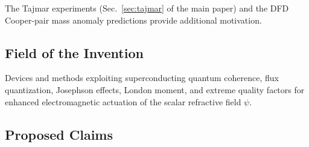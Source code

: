 \documentclass[12pt,letterpaper]{article}
\begin{document}
The Tajmar experiments (Sec.~\ref{sec:tajmar} of the main paper) and
the DFD Cooper-pair mass anomaly predictions provide additional
motivation.

\subsection{Field of the Invention}

Devices and methods exploiting superconducting quantum coherence,
flux quantization, Josephson effects, London moment, and extreme
quality factors for enhanced electromagnetic actuation of the scalar
refractive field $\psi$.

\subsection{Proposed Claims}
\end{document}
